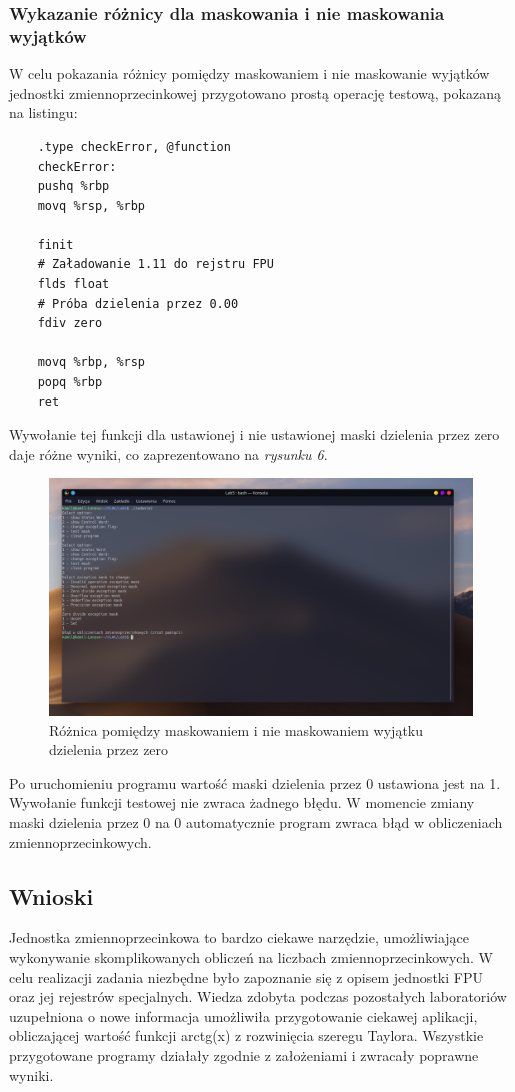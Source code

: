\documentclass[a4paper,12pt]{article}
\begin{document}
\subsubsection{Wykazanie różnicy dla maskowania i nie maskowania wyjątków}
W celu pokazania różnicy pomiędzy maskowaniem i nie maskowanie wyjątków jednostki zmiennoprzecinkowej przygotowano prostą operację testową, pokazaną na listingu:
\begin{verbatim}
	.type checkError, @function
	checkError:
	pushq %rbp
	movq %rsp, %rbp
	
	finit
	# Załadowanie 1.11 do rejstru FPU
	flds float
	# Próba dzielenia przez 0.00
	fdiv zero
	
	movq %rbp, %rsp
	popq %rbp
	ret
\end{verbatim}
Wywołanie tej funkcji dla ustawionej i nie ustawionej maski dzielenia przez zero daje różne wyniki, co zaprezentowano na \textit{rysunku 6}.
\begin{center}
	\begin{figure}[h]
		\centering\includegraphics[width=17cm]{Materialy/Lab5/check}
		\caption{Różnica pomiędzy maskowaniem i nie maskowaniem wyjątku dzielenia przez zero}
		\label{check}
	\end{figure}
\end{center}
Po uruchomieniu programu wartość maski dzielenia przez 0 ustawiona jest na 1. Wywołanie funkcji testowej nie zwraca żadnego błędu. W momencie zmiany maski dzielenia przez 0 na 0 automatycznie program zwraca błąd w obliczeniach zmiennoprzecinkowych.
\subsection{Wnioski}
Jednostka zmiennoprzecinkowa to bardzo ciekawe narzędzie, umożliwiające wykonywanie skomplikowanych obliczeń na liczbach zmiennoprzecinkowych. W celu realizacji zadania niezbędne było zapoznanie się z opisem jednostki FPU oraz jej rejestrów specjalnych. Wiedza zdobyta podczas pozostałych laboratoriów uzupełniona o nowe informacja umożliwiła przygotowanie ciekawej aplikacji, obliczającej wartość funkcji arctg(x) z rozwinięcia szeregu Taylora. Wszystkie przygotowane programy działały zgodnie z założeniami i zwracały poprawne wyniki.
\end{document}
